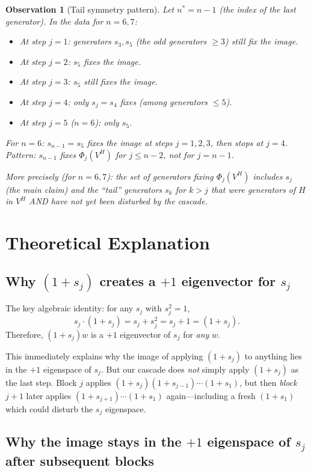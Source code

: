 \documentclass[12pt]{article}
\newtheorem{observation}[theorem]{Observation}
\theoremstyle{definition}
\begin{document}
\begin{observation}[Tail symmetry pattern]
  Let $n^* = n-1$ (the index of the last generator). In the data for $n = 6, 7$:
  \begin{itemize}
    \item At step $j = 1$: generators $s_3, s_5$ (the odd generators $\ge 3$) still fix the image.
    \item At step $j = 2$: $s_5$ fixes the image.
    \item At step $j = 3$: $s_5$ still fixes the image.
    \item At step $j = 4$: only $s_j = s_4$ fixes (among generators $\le 5$).
    \item At step $j = 5$ ($n=6$): only $s_5$.
  \end{itemize}

  For $n=6$: $s_{n-1} = s_5$ fixes the image at steps $j = 1, 2, 3$, then stops at $j = 4$.
  Pattern: $s_{n-1}$ fixes $\Phi_j(V^H)$ for $j \le n-2$, not for $j = n-1$.

  More precisely (for $n=6, 7$): the set of generators fixing $\Phi_j(V^H)$ includes $s_j$ (the main claim) and the ``tail'' generators $s_k$ for $k > j$ that were generators of $H$ in $V^H$ AND have not yet been disturbed by the cascade.
\end{observation}

\section{Theoretical Explanation}

\subsection{Why $(1+s_j)$ creates a $+1$ eigenvector for $s_j$}

The key algebraic identity: for any $s_j$ with $s_j^2 = 1$,
\[
  s_j \cdot (1 + s_j) = s_j + s_j^2 = s_j + 1 = (1 + s_j).
\]
Therefore, $(1+s_j)w$ is a $+1$ eigenvector of $s_j$ for \emph{any} $w$.

This immediately explains why the image of applying $(1+s_j)$ to anything lies in the $+1$ eigenspace of $s_j$. But our cascade does \emph{not} simply apply $(1+s_j)$ as the last step. Block $j$ applies $(1+s_j)(1+s_{j-1})\cdots(1+s_1)$, but then \emph{block $j+1$} later applies $(1+s_{j+1})\cdots(1+s_1)$ again---including a fresh $(1+s_1)$ which could disturb the $s_j$ eigenspace.

\subsection{Why the image stays in the $+1$ eigenspace of $s_j$ after subsequent blocks}
\end{document}
